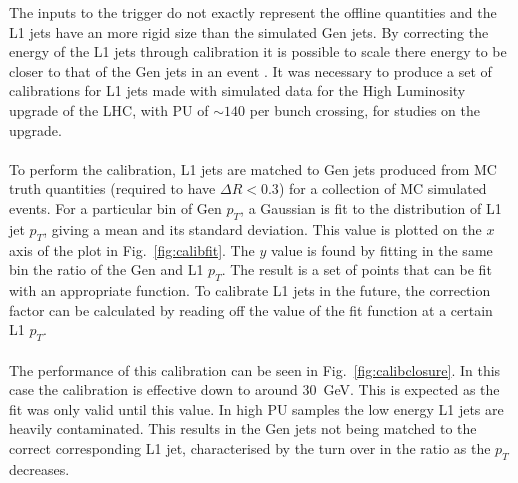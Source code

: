 The inputs to the trigger do not exactly represent the offline quantities and the L1 jets have an more rigid size than the simulated Gen jets. By correcting the energy of the L1 jets through calibration it is possible to scale there energy to be closer to that of the Gen jets in an event \cite{l1jet-calibration}. It was necessary to produce a set of calibrations for L1 jets made with simulated data for the High Luminosity upgrade of the LHC, with PU of $\sim140$ per bunch crossing, for studies on the upgrade.
\\\\
To perform the calibration, L1 jets are matched to Gen jets produced from MC truth quantities (required to have $\Delta R<0.3$) for a collection of MC simulated events. For a particular bin of Gen $p_T$, a Gaussian is fit to the distribution of L1 jet $p_T$, giving a mean and its standard deviation. This value is plotted on the $x$ axis of the plot in Fig.~\ref{fig:calibfit}. The $y$ value is found by fitting in the same bin the ratio of the Gen and L1 $p_T$. The result is a set of points that can be fit with an appropriate function. To calibrate L1 jets in the future, the correction factor can be calculated by reading off the value of the fit function at a certain L1 $p_T$. 
\\\\
The performance of this calibration can be seen in Fig.~\ref{fig:calibclosure}. In this case the calibration is effective down to around $30$~GeV. This is expected as the fit was only valid until this value. In high PU samples the low energy L1 jets are heavily contaminated. This results in the Gen jets not being matched to the correct corresponding L1 jet, characterised by the turn over in the ratio as the $p_T$ decreases.

